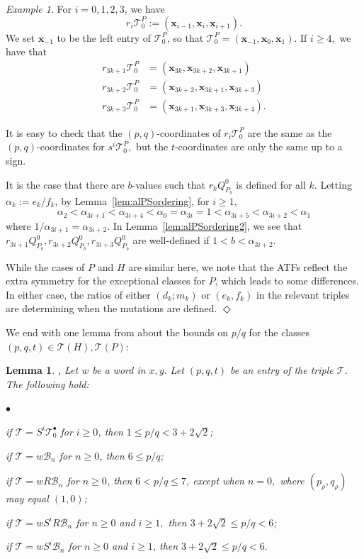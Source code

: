 \documentclass[11pt, reqno]{amsart}
\newtheorem{lemma}[thm]{Lemma}
\theoremstyle{remark}
\numberwithin{equation}{subsection}
\numberwithin{figure}{section}
\theoremstyle{customremark}
\newtheorem{example_no_diamond}[thm]{Example}
\newenvironment{example}{\begin{example_no_diamond} } {\hfill$\er$ \end{example_no_diamond}}
\newcommand{\Tt}{\mathcal{T}}
\newenvironment{itemlist}
   { \begin{list} {$\bullet$}
         { \setlength{\topsep}{.5ex}  \setlength{\itemsep}{.5ex} \setlength{\leftmargin}{2.5ex} } }
   { \end{list} }
\newcommand{\al}{{\alpha}}
\newcommand{\er}{{\Diamond}}
\begin{document}
\begin{example}
For $i=0,1,2,3$, we have
\[r_{i}\Tt_0^P:=(\bm{x}_{i-1},\bm{x}_i,\bm{x}_{i+1}).\]
We set \(\bm{x}_{-1}\) to be the left entry of \(\Tt_0^P\), so that
\(\Tt_0^P=(\bm{x}_{-1},\bm{x}_0,\bm{x}_1)\).
If $i \geq 4,$ we have that
\begin{align*}
    r_{3k+1}\Tt_0^P&=(\bm{x}_{3k},\bm{x}_{3k+2},\bm{x}_{3k+1}) \\
    r_{3k+2}\Tt_0^P&=(\bm{x}_{3k+2},\bm{x}_{3k+1},\bm{x}_{3k+3}) \\
    r_{3k+3}\Tt_0^P&=
    (\bm{x}_{3k+1},\bm{x}_{3k+3},\bm{x}_{3k+4}).  
\end{align*}


It is easy to check that the $(p,q)$-coordinates of $r_i\Tt_0^P$ are the same as the $(p,q)$-coordinates for $s^i\Tt_0^P,$ but the $t$-coordinates are only the same up to a sign. 

It is the case that there are $b$-values such that $r_k Q_{P_b}^0$ is defined for all $k.$ Letting $\al_k:=e_k/f_k$, by Lemma~\ref{lem:alPSordering}, for $i \geq 1,$
\[ \al_2<\al_{3i+1}<\al_{3i+4}<\al_0=\al_{3i}=1<\al_{3i+5}<\al_{3i+2}<\al_1\]
where $1/\al_{3i+1}=\al_{3i+2}.$ In Lemma~\ref{lem:alPSordering2}, we see that $r_{3i+1}Q_{P_b}^0,r_{3i+2}Q_{P_b}^0,r_{3i+3}Q_{P_b}^0$ are well-defined if $1<b<\al_{3i+2}.$ 

   While the cases of $P$ and $H$ are similar here, we note that the ATFs reflect the extra symmetry for the exceptional classes for $P$, which leads to some differences. In either case, the ratios of either $(d_k;m_k)$ or $(e_k,f_k)$ in the relevant triples are determining when the mutations are defined.
\end{example}


We end with one lemma from \cite{MM,MPW} about the bounds on $p/q$ for the classes $(p,q,t) \in \mathcal{T}(H),\mathcal{T}(P)$:
\begin{lemma}\cite[Lemma 2.1.5]{MM},\cite[Theorem 3.1.3]{MPW} \label{lem:pOverq6}
    Let $w$ be a word in $x,y.$ Let $(p,q,t)$ be an entry of the triple $\Tt$. The following hold:  
    \begin{itemlist}
        \item[{(i)}] if $\Tt=S^i\Tt_0^\bullet$ for $i \geq 0$, then $1\leq p/q<3+2\sqrt{2}$;
        \item[{(ii)}] if $\Tt=w\mathcal{B}_n$ for $n \geq 0$, then $6 \leq p/q$;
        \item[{(iii)}] if $\Tt=wR\mathcal{B}_n$ for $n \geq 0$, then $6 < p/q \leq 7$, except when $n=0,$ where $(p_\rho,q_\rho)$ may equal $(1,0)$;
        \item[{(iv)}] if $\Tt=wS^iR\mathcal{B}_n$ for $n \geq 0$ and $i \geq 1,$ then $3+2\sqrt{2} \leq p/q < 6$;
        \item[{(v)}] if $\Tt=wS^i\mathcal{B}_n$ for $n \geq 0$ and $i \geq 1$, then $3+2\sqrt{2} \leq p/q < 6.$
    \end{itemlist}
\end{lemma}
\end{document}

